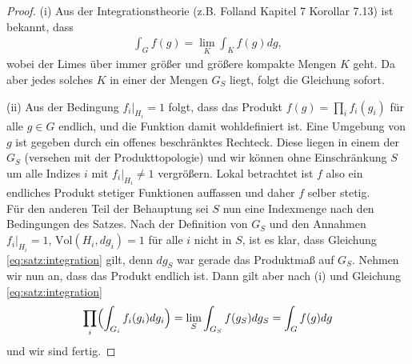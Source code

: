 		\begin{proof}
			(i) Aus der Integrationstheorie (z.B. Folland \cite{folland} Kapitel 7 Korollar 7.13) ist bekannt, dass %
			\begin{align*}
				\int_{G} f(g) = \lim_{K} \int_{K} f(g)dg,
			\end{align*}
			wobei der Limes über immer größer und größere kompakte Mengen $K$ geht. Da aber jedes solches $K$ in einer der Mengen $G_S$ liegt, folgt die Gleichung sofort.
			
			\noindent(ii) Aus der Bedingung $f_i |_{H_i} = 1$ folgt, dass das Produkt $f(g) = \prod_{i}f_{i}(g_i)$ für alle $g \in G$ endlich, und die Funktion damit wohldefiniert ist. Eine Umgebung von $g$ ist gegeben durch ein offenes beschränktes Rechteck. Diese liegen in einem der $G_S$ (versehen mit der Produkttopologie) und wir können ohne Einschränkung $S$ um alle Indizes $i$ mit $f_i|_{H_i}\not= 1$ vergrößern.
			Lokal betrachtet ist $f$ also ein endliches Produkt stetiger Funktionen auffassen und daher $f$ selber stetig.\\
			Für den anderen Teil der Behauptung sei $S$ nun eine Indexmenge nach den Bedingungen des Satzes. 
			Nach der Definition von $G_S$ und den Annahmen $f_i|_{H_i} = 1$, $\text{Vol}(H_i, dg_i) = 1$ für alle $i$ nicht in $S$, ist es klar, dass Gleichung \ref{eq:satz:integration} gilt, denn $dg_S$ war gerade das Produktmaß auf $G_S$. Nehmen wir nun an, dass das Produkt endlich ist. 
			Dann gilt aber nach (i) und Gleichung \ref{eq:satz:integration}
			\begin{align*}
				\prod_{i}\Bigl(\int_{G_i} f_i (g_i)dg_i\Bigr) = \lim_S \int_{G_S} f(g_S) dg_S = \int_{G} f(g) dg
			\end{align*}
			und wir sind fertig.
		\end{proof}

